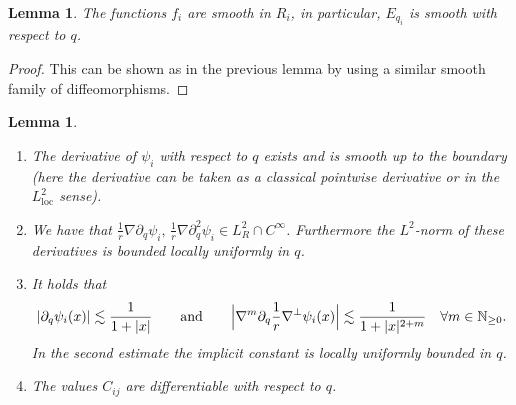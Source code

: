 \documentclass[10pt]{amsart}
\newcommand{\loc}{\mathrm{loc}}
\newtheorem{lemma}[theorem]{Lemma}
\theoremstyle{definition}
\newcommand\N{\mathbb{N}}
\let\de\partial
\begin{document}
\begin{lemma}
The functions $f_i$ are smooth in $R_i$, in particular, $E_{q_i}$ is smooth with respect to $q$.
\end{lemma}
\begin{proof}This can be shown as in the previous lemma by using a similar smooth family of diffeomorphisms.\end{proof}

\skpt
\begin{lemma}\label{PsiDeri}
\begin{enumerate}
\item\label{PsiDeria} The derivative of $\psi_i$ with respect to $q$ exists and is smooth up to the boundary (here the derivative can \eg be taken as a classical pointwise derivative or in the $L_{\loc}^2$ sense).
\item\label{PsiDerib} We have that $\frac{1}{r}\nabla\de_q\psi_i,\,\frac{1}{r}\nabla\de_q^2\psi_i\in L_R^2\cap C^\infty$. Furthermore the $L^2$-norm of these derivatives is bounded locally uniformly in $q$.
\item\label{PsiDeric} It holds that
\[
\left|\de_q\psi_i(x)\right|\lesssim \frac{1}{1+|x|}\qquad\text{and}\qquad
\Bigl|\nabla^m\de_q\frac{1}{r}\nabla^\perp\psi_i(x)\Bigr|\lesssim \frac{1}{1+|x|^{2+m}}\quad \forall m\in\N_{\geq0}.
\]
In the second estimate the implicit constant is locally uniformly bounded in $q$.
\item\label{PsiDerid} The values $C_{ij}$ are differentiable with respect to $q$.
\end{enumerate}
\end{lemma}
\end{document}
